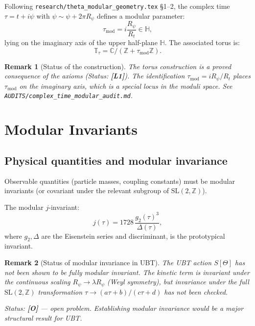 \documentclass[11pt,a4paper]{article}
\newtheorem{remark}{Remark}
\begin{document}
Following \texttt{research/theta\_modular\_geometry.tex} §1--2, the complex
time $\tau = t + i\psi$ with $\psi \sim \psi + 2\pi R_\psi$ defines a
modular parameter:
\begin{equation}
  \tau_{\mathrm{mod}} = i\frac{R_\psi}{R_t} \in \mathbb{H},
\end{equation}
lying on the imaginary axis of the upper half-plane $\mathbb{H}$.  The
associated torus is:
\begin{equation}
  \mathbb{T}_\tau = \mathbb{C}/(\mathbb{Z} + \tau_{\mathrm{mod}}\mathbb{Z}).
\end{equation}

\begin{remark}[Status of the construction]
  The torus construction is a proved consequence of the axioms (Status:
  \textbf{[L1]}).  The identification $\tau_{\mathrm{mod}} = iR_\psi/R_t$
  places $\tau_{\mathrm{mod}}$ on the imaginary axis, which is a special
  locus in the moduli space.  See
  \texttt{AUDITS/complex\_time\_modular\_audit.md}.
\end{remark}

\section{Modular Invariants}
\label{sec:modular_inv}

\subsection{Physical quantities and modular invariance}

Observable quantities (particle masses, coupling constants) must be
modular invariants (or covariant under the relevant subgroup of
$\mathrm{SL}(2,\mathbb{Z})$).

The modular $j$-invariant:
\begin{equation}
\label{eq:j_inv}
  j(\tau) = 1728\, \frac{g_2(\tau)^3}{\Delta(\tau)},
\end{equation}
where $g_2, \Delta$ are the Eisenstein series and discriminant, is the
prototypical invariant.

\begin{remark}[Status of modular invariance in UBT]
  The UBT action $S[\Theta]$ has not been shown to be fully modular invariant.
  The kinetic term is invariant under the continuous scaling $R_\psi \to \lambda R_\psi$
  (Weyl symmetry), but invariance under the full $\mathrm{SL}(2,\mathbb{Z})$
  transformation $\tau \to (a\tau+b)/(c\tau+d)$ has not been checked.

  Status: \textbf{[O]} — open problem.  Establishing modular invariance
  would be a major structural result for UBT.
\end{remark}
\end{document}
